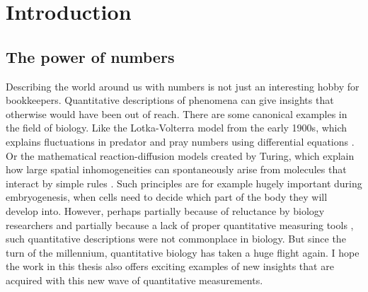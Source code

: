 \chapter{Introduction}
\label{chapter:introduction}







\section{The power of numbers}

%
Describing the world around us with numbers is not just an interesting hobby for bookkeepers.
%
Quantitative descriptions of phenomena can give insights that otherwise would have been out of reach.
%
%
%
There are some canonical examples in the field of biology.
%
Like the Lotka-Volterra model from the early 1900s, which explains fluctuations in predator and pray numbers using differential equations \cite{Lotka1920,Volterra1928}.
Or the mathematical reaction-diffusion models created by Turing, which explain how large spatial inhomogeneities can spontaneously arise from molecules 
that interact by simple rules \cite{Turing1952}.
Such principles are for example hugely important during embryogenesis, when cells need to decide which part of the body they will develop into.
%
However, perhaps partially because of reluctance by biology researchers \cite{Lazebnik2003} and partially because a lack of proper quantitative measuring tools \cite{Kitano2002, Wollman2018}, such quantitative descriptions %
were not commonplace in biology.
%
But since the turn of the millennium, 
quantitative biology has taken a huge flight again.
%
I hope the work in this thesis also offers exciting examples of new insights that are acquired with this new wave of quantitative measurements.

